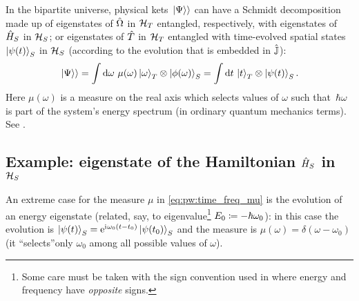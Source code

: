 
In the bipartite universe, physical kets $\left.\left| \Psi \right\rangle\right\rangle$ can have a Schmidt decomposition
made up of
eigenstates of $\hat{\Omega}$ in $\mathcal{H}_T$
entangled, respectively, with
eigenstates of $\hat{H}_S$ in $\mathcal{H}_S$;
or eigenstates of $\hat{T}$ in $\mathcal{H}_T$
entangled with time-evolved spatial states~$\ket{\psi(t)}_S$ in $\mathcal{H}_S$
(according to the evolution that is embedded in $\hat{\mathbb{J}}$):
\begin{equation}\label{eq:pw:time_freq_mu}
  \left.\left| \Psi \right\rangle\right\rangle =
    \int \dd{\omega} \, \mu(\omega) \ket{\omega}_{T}\otimes\ket{\phi(\omega)}_{S} =
    \int \dd{t} \, \ket{t}_{T} \otimes \ket{\psi(t)}_{S} \text{.}
\end{equation}
Here $\mu(\omega)$ is a measure on the real axis which selects
values of $\omega$ such that~$\hbar\omega$ is part of the system's energy spectrum
(in ordinary quantum mechanics terms). See \cite[eq. (10)]{Lloyd:Time}.

\subsection{Example: eigenstate of the Hamiltonian $\hat{H}_S$ in $\mathcal{H}_S$}\label{sec:pw:eeigenstate}

An extreme case for the measure $\mu$ in \eqref{eq:pw:time_freq_mu}
is the evolution of an energy eigenstate
(related, say, to eigenvalue\footnote{
  Some care must be taken with the sign convention used in
  \cite{Lloyd:Time} where
  energy and frequency have \emph{opposite} signs.
}
$E_0 \coloneqq -\hbar\omega_{0}$):
in this case the evolution is
$\ket{\psi(t)}_{S} = \mathrm{e}^{\mathrm{i}\mkern1mu\omega_{0}(t-t_{0})} \ket{\psi(t_0)}_{S}$
and
the measure is
$\mu(\omega) = \delta(\omega-\omega_0)$
(it  ``selects''only $\omega_0$ among all possible values
of $\omega$).

